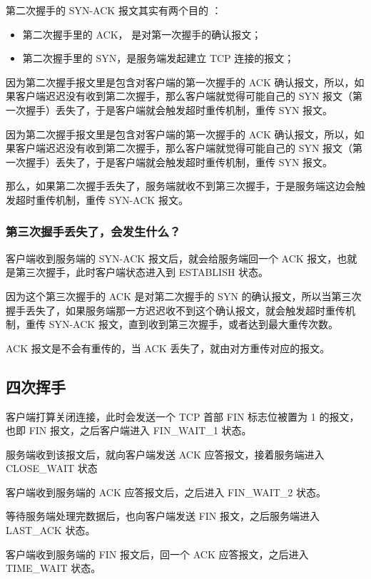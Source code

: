 \documentclass[11pt]{article}
\begin{document}
第二次握手的 SYN-ACK 报文其实有两个目的 ：
\begin{itemize}
\item 第二次握手里的 ACK， 是对第一次握手的确认报文；
\item 第二次握手里的 SYN，是服务端发起建立 TCP 连接的报文；
\end{itemize}

因为第二次握手报文里是包含对客户端的第一次握手的 ACK 确认报文，所以，如果客户端迟迟没有收到第二次握手，那么客户端就觉得可能自己的 SYN 报文（第一次握手）丢失了，于是客户端就会触发超时重传机制，重传 SYN 报文。

因为第二次握手报文里是包含对客户端的第一次握手的 ACK 确认报文，所以，如果客户端迟迟没有收到第二次握手，那么客户端就觉得可能自己的 SYN 报文（第一次握手）丢失了，于是客户端就会触发超时重传机制，重传 SYN 报文。

那么，如果第二次握手丢失了，服务端就收不到第三次握手，于是服务端这边会触发超时重传机制，重传 SYN-ACK 报文。

\subsubsection{第三次握手丢失了，会发生什么？}
\label{sec:orgeaec98d}
客户端收到服务端的 SYN-ACK 报文后，就会给服务端回一个 ACK 报文，也就是第三次握手，此时客户端状态进入到 ESTABLISH 状态。

因为这个第三次握手的 ACK 是对第二次握手的 SYN 的确认报文，所以当第三次握手丢失了，如果服务端那一方迟迟收不到这个确认报文，就会触发超时重传机制，重传 SYN-ACK 报文，直到收到第三次握手，或者达到最大重传次数。

ACK 报文是不会有重传的，当 ACK 丢失了，就由对方重传对应的报文。

\subsection{四次挥手}
\label{sec:orga90f475}
客户端打算关闭连接，此时会发送一个 TCP 首部 FIN 标志位被置为 1 的报文，也即 FIN 报文，之后客户端进入 FIN\_WAIT\_1 状态。

服务端收到该报文后，就向客户端发送 ACK 应答报文，接着服务端进入 CLOSE\_WAIT 状态

客户端收到服务端的 ACK 应答报文后，之后进入 FIN\_WAIT\_2 状态。

等待服务端处理完数据后，也向客户端发送 FIN 报文，之后服务端进入 LAST\_ACK 状态。

客户端收到服务端的 FIN 报文后，回一个 ACK 应答报文，之后进入 TIME\_WAIT 状态。
\end{document}
